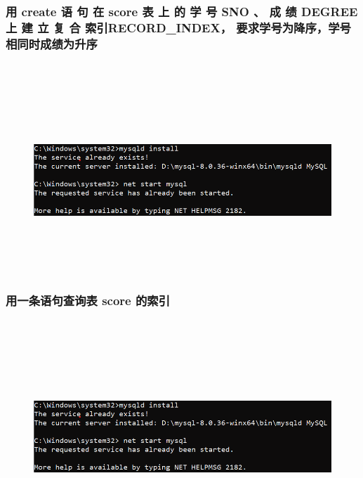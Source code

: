 \documentclass{ctexart}
\begin{document}
\subsubsection{用 create 语 句 在 score 表 上 的 学 号 SNO 、 成 绩 DEGREE 上 建 立 复 合 索引RECORD\_INDEX， 要求学号为降序，学号相同时成绩为升序}
\begin{lstlisting}[language=sql]
	
\end{lstlisting}
\begin{figure}[H]
	\centering 
	\includegraphics[height=7cm,width=14cm]{1.png}
	\end{figure}
\subsubsection{用一条语句查询表 score 的索引}
\begin{lstlisting}[language=sql]
	
\end{lstlisting}
\begin{figure}[H]
	\centering 
	\includegraphics[height=7cm,width=14cm]{1.png}
	\end{figure}
\end{document}
